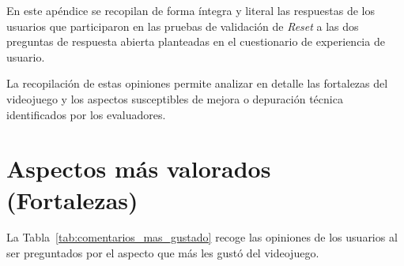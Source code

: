 En este apéndice se recopilan de forma íntegra y literal las respuestas de los usuarios que participaron en las pruebas de validación de \textit{Reset} a las dos preguntas de respuesta abierta planteadas en el cuestionario de experiencia de usuario. 

La recopilación de estas opiniones permite analizar en detalle las fortalezas del videojuego y los aspectos susceptibles de mejora o depuración técnica identificados por los evaluadores.

\renewcommand{\arraystretch}{1.4}

\section{Aspectos más valorados (Fortalezas)}
La Tabla~\ref{tab:comentarios_mas_gustado} recoge las opiniones de los usuarios al ser preguntados por el aspecto que más les gustó del videojuego.

